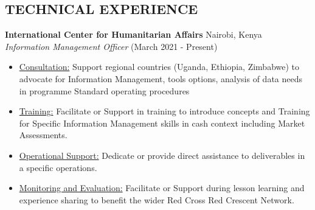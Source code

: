 \documentclass[line,margin,10pt]{res}
\begin{document}
\begin{resume}
\section{TECHNICAL EXPERIENCE}
\textbf{International Center for Humanitarian Affairs} \hfill Nairobi, Kenya\\
{\sl Information Management Officer} \hfill (March 2021 - Present)
\begin{itemize} \itemsep -2pt
	\item \underline{Consultation:}
    Support regional countries (Uganda, Ethiopia, Zimbabwe) to advocate for Information Management, tools options, analysis of data needs in programme Standard operating procedures
    \item \underline{Training:}
    Facilitate or Support in training to introduce concepts and Training for Specific Information Management skills in cash context including Market Assessments.
    \item \underline{Operational Support:}
    Dedicate or provide direct assistance to deliverables in a specific operations.
    \item \underline{Monitoring and Evaluation:}
    Facilitate or Support during lesson learning and experience sharing to benefit the wider Red Cross Red Crescent Network.

\end{itemize}
\end{resume}
\end{document}
